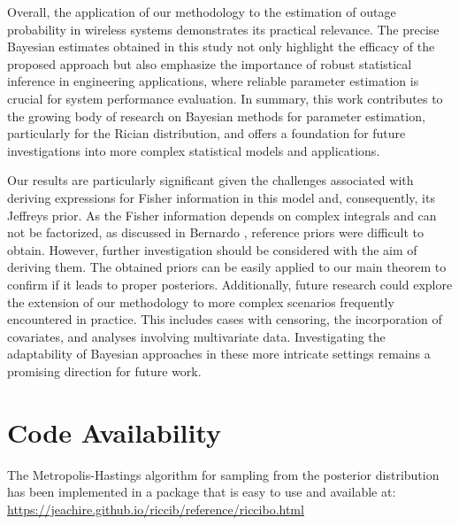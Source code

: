 \documentclass[12pt]{interact}
\theoremstyle{plain}%
\theoremstyle{definition}
\theoremstyle{remark}
\begin{document}
Overall, the application of our methodology to the estimation of outage probability in wireless systems demonstrates its practical relevance. The precise Bayesian estimates obtained in this study not only highlight the efficacy of the proposed approach but also emphasize the importance of robust statistical inference in engineering applications, where reliable parameter estimation is crucial for system performance evaluation. In summary, this work contributes to the growing body of research on Bayesian methods for parameter estimation, particularly for the Rician distribution, and offers a foundation for future investigations into more complex statistical models and applications.


Our results are particularly significant given the challenges associated with deriving expressions for Fisher information in this model and, consequently, its Jeffreys prior. As the Fisher information depends on complex integrals and can not be factorized, as discussed in Bernardo \cite{bernardo2005}, reference priors were difficult to obtain. However, further investigation should be considered with the aim of deriving them. The obtained priors can be easily applied to our main theorem to confirm if it leads to proper posteriors. Additionally, future research could explore the extension of our methodology to more complex scenarios frequently encountered in practice. This includes cases with censoring, the incorporation of covariates, and analyses involving multivariate data. Investigating the adaptability of Bayesian approaches in these more intricate settings remains a promising direction for future work.

\section*{Code Availability}

The Metropolis-Hastings algorithm for sampling from the posterior distribution has been implemented in a package that is easy to use and available at: \\ \url{https://jeachire.github.io/riccib/reference/riccibo.html}





\end{document}
